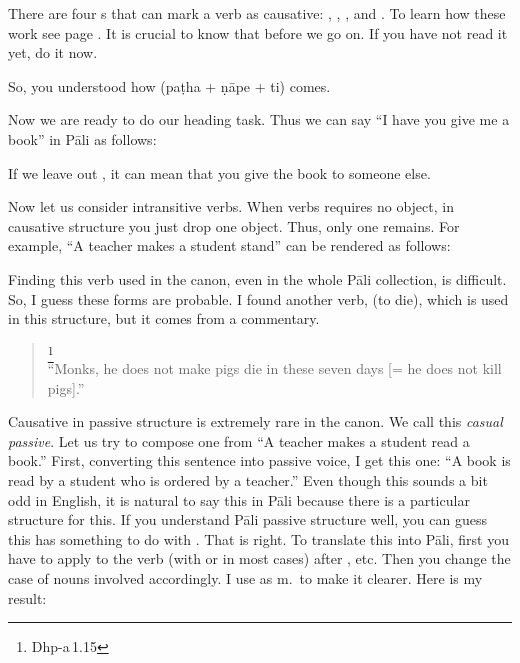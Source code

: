 There are four s that can mark a verb as causative: , , , and . To learn how these work see page \pageref{pacca:dne2}. It is crucial to know that before we go on. If you have not read it yet, do it now.

So, you understood how  (pa\d tha + \d n\=ape + ti) comes.

Now we are ready to do our heading task. Thus we can say ``I have you give me a book'' in P\=ali as follows:


If we leave out , it can mean that you give the book to someone else.

Now let us consider intransitive verbs. When verbs requires no object, in causative structure you just drop one object. Thus, only one remains. For example, ``A teacher makes a student stand'' can be rendered as follows:


Finding this verb used in the canon, even in the whole P\=ali collection, is difficult. So, I guess these forms are probable. I found another verb,  (to die), which is used in this structure, but it comes from a commentary.

\begin{quote}
\footnote{Dhp-a\,1.15}\\
``Monks, he does not make pigs die in these seven days [= he does not kill pigs].''\\
\end{quote}

Causative in passive structure is extremely rare in the canon. We call this \emph{casual passive}. Let us try to compose one from ``A teacher makes a student read a book.'' First, converting this sentence into passive voice, I get this one: ``A book is read by a student who is ordered by a teacher.'' Even though this sounds a bit odd in English, it is natural to say this in P\=ali because there is a particular structure for this. If you understand P\=ali passive structure well, you can guess this has something to do with . That is right. To translate this into P\=ali, first you have to apply  to the verb (with  or  in most cases) after , etc. Then you change the case of nouns involved accordingly. I use  as m.\ to make it clearer. Here is my result:

